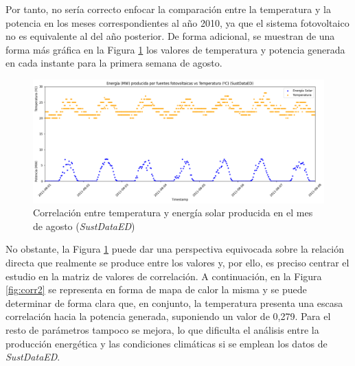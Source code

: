 \vspace{3mm}

Por tanto, no sería correcto enfocar la comparación entre la temperatura y la potencia en los meses correspondientes al año 2010, ya que el sistema fotovoltaico no es equivalente al del año posterior. De forma adicional, se muestran de una forma más gráfica en la Figura \ref{fig:energiavstemp} los valores de temperatura y potencia generada en cada instante para la primera semana de agosto. 

\vspace{3mm}

\begin{figure}[h!]
  \centering
  \includegraphics[width=1\textwidth]{img/diseno/energiavstemp.png}
  \caption{Correlación entre temperatura y energía solar producida en el mes de agosto (\textit{SustDataED})}
  \label{fig:energiavstemp}
\end{figure}

\vspace{3mm}

No obstante, la Figura \ref{fig:energiavstemp} puede dar una perspectiva equivocada sobre la relación directa que realmente se produce entre los valores y, por ello, es preciso centrar el estudio en la matriz de valores de correlación. A continuación, en la Figura \ref{fig:corr2} se representa en forma de mapa de calor la misma y se puede determinar de forma clara que, en conjunto, la temperatura presenta una escasa correlación hacia la potencia generada, suponiendo un valor de 0,279. Para el resto de parámetros tampoco se mejora, lo que dificulta el análisis entre la producción energética y las condiciones climáticas si se emplean los datos de \textit{SustDataED}.

\vspace{3mm}

